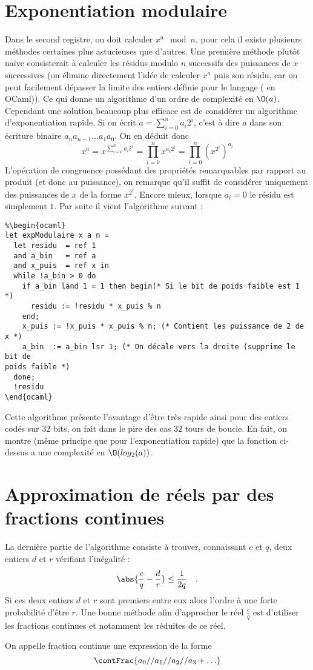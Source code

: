 \documentclass[a4paper,11pt]{tipe}
\begin{document}
\section{Exponentiation modulaire}
Dans le second registre, on doit calculer $x ^ a \mod n$, pour cela il existe
plusieurs méthodes certaines plus astucieuses que d'autres. Une première
méthode plutôt naïve consisterait à calculer les résidus modulo $n$ successifs
des puissances de $x$ successives (on élimine directement l'idée de calculer
$x^a$ puis son résidu, car on peut facilement dépasser la limite des entiers
définie pour le langage ( en OCaml)). Ce qui donne un
algorithme d'un ordre de complexité en $\O(a)$. Cependant une solution beaucoup
plus efficace est de considérer un algorithme d’exponentiation rapide.
Si on écrit $a = \sum_{i=0}^{n} a_i 2^i$, c'est à dire $a$ dans son écriture
binaire $a_n a_{n-1} \dots a_1 a_0$. On en déduit donc 
\[ x^a = x ^ {\sum_{i=0}^{n} a_i 2^i} = \prod_{i=0}^{n} x ^ {a_i 2^i}
 =  \prod_{i=0}^{n} \left( x ^ {2^i}\right) ^{a_i} \]
L'opération de congruence possédant des propriétés remarquables par rapport au
produit (et donc au puissance), on remarque qu'il suffit de considérer
uniquement des puissances de $x$ de la forme $x ^ {2^i}$. Encore mieux, lorsque
$a_i = 0$ le résidu est simplement $1$. Par suite il vient l'algorithme suivant
:
\begin{verbatim}
%\begin{ocaml}
let expModulaire x a n =
  let residu  = ref 1
  and a_bin   = ref a
  and x_puis  = ref x in
  while !a_bin > 0 do
    if a_bin land 1 = 1 then begin(* Si le bit de poids faible est 1 *)
      residu := !residu * x_puis % n
    end;
    x_puis := !x_puis * x_puis % n; (* Contient les puissance de 2 de x *)
    a_bin  := a_bin lsr 1; (* On décale vers la droite (supprime le bit de
poids faible *)
  done;
  !residu
\end{ocaml}
\end{verbatim}
Cette algorithme présente l'avantage d'être très rapide ainsi pour des entiers
codés sur $32$ bits, on fait dans le pire des cas $32$ tours de boucle. En
fait, on montre (même principe que pour l'exponentiation rapide) que la
fonction ci-dessus a une complexité en $\O(log_2(a))$. 

\section{Approximation de réels par des fractions continues}
La dernière partie de l'algorithme consiste à trouver, connaissant $c$ et $q$,
deux entiers $d$ et $r$ vérifiant l'inégalité :
\[ \abs{ \frac c q - \frac d r } \leq \frac 1 {2q} \quad .\]
Si ces deux entiers $d$ et $r$ sont premiers entre eux alors l'ordre à une forte
probabilité d'être $r$.
Une bonne méthode afin d'approcher le réel $\frac c q$ est d'utiliser les
fractions continues et notamment les réduites de ce réel.
\begin{definition}
On appelle fraction continue une expression de la forme
\[\contFrac{ a_0 // {a_1 // {a_2 // {a_3 + \dots}}}}\] 
\end{definition}
\end{document}
